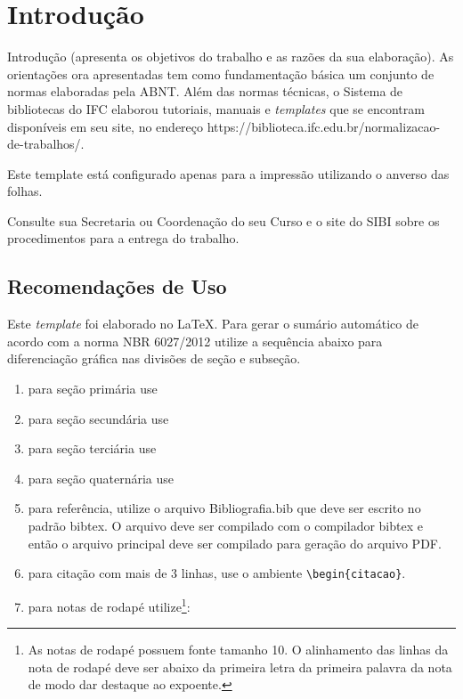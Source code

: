\chapter{Introdução}

Introdução (apresenta os objetivos do trabalho e as razões da sua elaboração).
As orientações ora apresentadas tem como fundamentação básica um conjunto de normas elaboradas pela ABNT. Além das normas técnicas, o Sistema de bibliotecas do IFC elaborou tutoriais, manuais e \textit{templates} que se encontram disponíveis em seu site, no endereço https://biblioteca.ifc.edu.br/normalizacao-de-trabalhos/.

Este template está configurado apenas para a impressão utilizando o anverso das folhas.

Consulte sua Secretaria ou Coordenação do seu Curso e o site do SIBI sobre os procedimentos para a entrega do trabalho.

\section{Recomendações de Uso}
Este \textit{template} foi elaborado no \LaTeX . Para gerar o sumário automático de acordo com a norma NBR 6027/2012 utilize a sequência abaixo para diferenciação gráfica nas divisões de seção e subseção.

\begin{enumerate}[label=\alph*)]
   \item para seção primária use \texttt{\detokenize{\chapter}}
   \item para seção secundária use \texttt{\detokenize{\section}}
   \item para seção terciária use \texttt{\detokenize{\subsection}}
   \item para seção quaternária use \texttt{\detokenize{\subsubsection}}
   \item para referência, utilize o arquivo Bibliografia.bib que deve ser escrito no padrão bibtex. O arquivo deve ser compilado com o compilador bibtex e então o arquivo principal deve ser compilado para geração do arquivo PDF.
   \item para citação com mais de 3 linhas, use o ambiente \verb!\begin!\verb!{citacao}!.
   \item para notas de rodapé utilize\footnote{As notas de rodapé possuem fonte tamanho 10. O alinhamento das linhas da nota de rodapé deve ser abaixo da primeira letra da primeira palavra da nota de modo dar destaque ao expoente.}: \texttt{\detokenize{\footnote}}
\end{enumerate}

